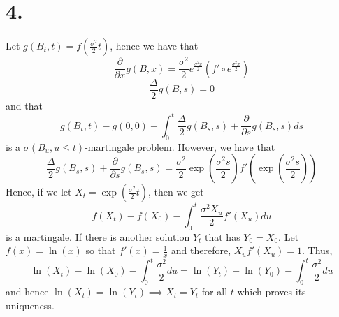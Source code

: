 \documentclass[11pt]{article}
\begin{document}
\section*{4.}
Let $g(B_t,t) = f\left( \frac{\sigma^2}{2}t \right)$, hence we have that 
\[
    \frac{\partial}{\partial x} g(B,x) = \frac{\sigma^2}{2} e^{\frac{\sigma^2 x}{2}} \left(f' \circ e^{\frac{\sigma^2 x}{2}} \right)
\]
\[
    \frac{\Delta}{2}g(B,s) = 0
\]
and that 
\[
    g(B_t,t) - g(0,0) - \int_0^t \frac{\Delta}{2} g(B_s,s) + \frac{\partial }{\partial s}g(B_s,s) ds   
\]
is a $\sigma(B_u, u \le t)$-martingale problem.
However, we have that 
\[
    \frac{\Delta}{2}g(B_s,s) + \frac{\partial }{\partial s}g(B_s,s) = \frac{\sigma^2}{2}\exp\left( \frac{\sigma^2s}{2} \right) f' \left( \exp\left( \frac{\sigma^2 s }{2} \right)\right)    
\]
Hence, if we let $X_t = \exp\left(\frac{\sigma^2}{2}t\right)$, then we get 
\[
    f(X_t) - f(X_0) - \int_0^t  \frac{\sigma^2 X_u}{2}f'(X_u)  du    
\]
is a martingale. If there is another solution $Y_t$ that has $Y_0 = X_0$. Let $f(x) = \ln(x)$ so that 
$f'(x) = \frac{1}{x}$ and therefore, $X_u f'(X_u) = 1$. Thus, 
\[
    \ln(X_t) - \ln(X_0) - \int_0^t \frac{\sigma^2}{2} du = \ln(Y_t) - \ln(Y_0) - \int_0^t \frac{\sigma^2}{2} du     
\]
and hence $\ln(X_t) = \ln(Y_t) \implies X_t = Y_t$ for all $t$ which proves its uniqueness.
\end{document}
